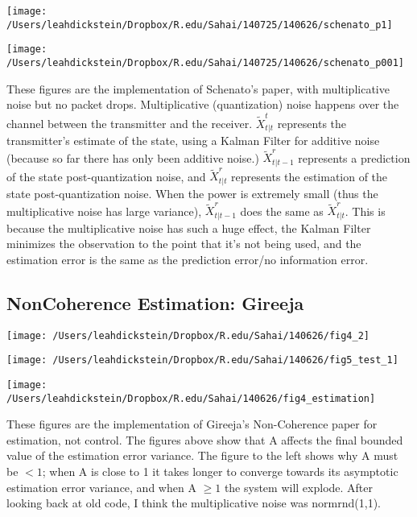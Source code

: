 \documentclass[leqno,twocolumn]{article}
\begin{document}
\begin{minipage}[c]{0.5\textwidth}
\texttt{[image: /Users/leahdickstein/Dropbox/R.edu/Sahai/140725/140626/schenato\_p1]}
\end{minipage}
\begin{minipage}[c]{0.5\textwidth}
\texttt{[image: /Users/leahdickstein/Dropbox/R.edu/Sahai/140725/140626/schenato\_p001]}
\end{minipage}

These figures are the implementation of Schenato's paper, with multiplicative noise but no packet drops. Multiplicative (quantization) noise happens over the channel between the transmitter and the receiver. $\tilde{X}^t_{t|t}$ represents the transmitter's estimate of the state, using a Kalman Filter for additive noise (because so far there has only been additive noise.) $\tilde{X}^r_{t|t-1}$ represents a prediction of the state post-quantization noise, and $\tilde{X}^r_{t|t}$ represents the estimation of the state post-quantization noise. When the power is extremely small (thus the multiplicative noise has large variance), $\tilde{X}^r_{t|t-1}$ does the same as $\tilde{X}^r_{t|t}$. This is because the multiplicative noise has such a huge effect, the Kalman Filter minimizes the observation to the point that it's not being used, and the estimation error is the same as the prediction error/no information error.

\subsection{NonCoherence Estimation: Gireeja}
\begin{minipage}[c]{0.5\textwidth}
\texttt{[image: /Users/leahdickstein/Dropbox/R.edu/Sahai/140626/fig4\_2]}
\end{minipage}
\begin{minipage}[c]{0.5\textwidth}
\texttt{[image: /Users/leahdickstein/Dropbox/R.edu/Sahai/140626/fig5\_test\_1]}
\end{minipage}

\begin{minipage}[c]{0.5\textwidth}
\texttt{[image: /Users/leahdickstein/Dropbox/R.edu/Sahai/140626/fig4\_estimation]}
\end{minipage}
\begin{minipage}[b]{0.5\textwidth}
These figures are the implementation of Gireeja's Non-Coherence paper for estimation, not control. The figures above show that A affects the final bounded value of the estimation error variance. The figure to the left shows why A must be $< 1$; when A is close to 1 it takes longer to converge towards its asymptotic estimation error variance, and when A $\geq 1$ the system will explode. After looking back at old code, I think the multiplicative noise was normrnd(1,1).
\end{minipage}
\end{document}
